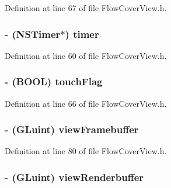 Definition at line 67 of file FlowCoverView.h.

\hypertarget{interface_flow_cover_view_a49efd1a3e05e38497c176a4e11fdbaab}{
\subsubsection[{timer}]{\setlength{\rightskip}{0pt plus 5cm}-\/ (NSTimer$\ast$) {\bf timer}}}
\label{interface_flow_cover_view_a49efd1a3e05e38497c176a4e11fdbaab}


Definition at line 60 of file FlowCoverView.h.

\hypertarget{interface_flow_cover_view_a1a25ad3e6c05c8e905d31e7a9dcbce20}{
\subsubsection[{touchFlag}]{\setlength{\rightskip}{0pt plus 5cm}-\/ (BOOL) {\bf touchFlag}}}
\label{interface_flow_cover_view_a1a25ad3e6c05c8e905d31e7a9dcbce20}


Definition at line 66 of file FlowCoverView.h.

\hypertarget{interface_flow_cover_view_ab782ac2fa71bae57432171d6ee8a0933}{
\subsubsection[{viewFramebuffer}]{\setlength{\rightskip}{0pt plus 5cm}-\/ (GLuint) {\bf viewFramebuffer}}}
\label{interface_flow_cover_view_ab782ac2fa71bae57432171d6ee8a0933}


Definition at line 80 of file FlowCoverView.h.

\hypertarget{interface_flow_cover_view_a0b132c2e2c9e93be7eff4b1d12644922}{
\subsubsection[{viewRenderbuffer}]{\setlength{\rightskip}{0pt plus 5cm}-\/ (GLuint) {\bf viewRenderbuffer}}}
\label{interface_flow_cover_view_a0b132c2e2c9e93be7eff4b1d12644922}


